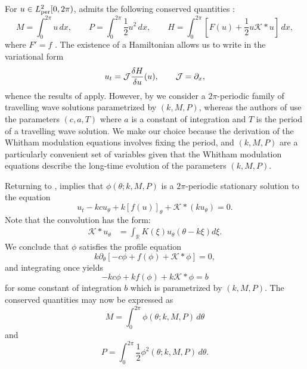 \documentclass[11pt,leqno]{article}
\numberwithin{equation}{section}
\renewcommand\d{\partial}
\newcommand{\R}{\mathbb R}
\theoremstyle{definition}
\begin{document}
For $u\in L^2_{\rm per}[0,2\pi)$,  admits the following conserved quantities \cite{BH14,NS1994}:
\[
M = \int_0^{2\pi} u\, dx, \qquad P = \int_0^{2\pi} \frac{1}{2}u^2\, dx,\qquad H = \int_0^{2\pi} \left[F(u) + \frac{1}{2}u\mathcal{K}*u\right]\,dx,
\]
where $F' = f$ . The existence of a Hamiltonian allows us to write  in the variational form
\[
u_t = \mathcal{J} \fdv{H}{u}()(u), \qquad \mathcal{J}=\d_x,
\]
whence the results of \cite{BH14} apply. However, by  we consider a $ 2\pi $-periodic family of travelling wave solutions parametrized by $ (k,M,P) $, whereas the authors of \cite{BH14} use the parameters $ (c,a,T) $ where $ a $ is a constant of integration and $ T $ is the period of a travelling wave solution. We make our choice because the derivation of the Whitham modulation equations involves fixing the period, and $ (k,M,P) $ are a particularly convenient set of variables given that the Whitham modulation equations describe the long-time evolution of the parameters $(k,M,P)$.

Returning to ,  implies that $\phi(\theta;k,M,P)$ is a $2\pi$-periodic stationary solution to the equation
\begin{equation}\label{eq:stationary}
	u_t - kc u_\theta + k[f(u)]_\theta + \mathcal{K}*(ku_\theta) = 0.
\end{equation} 
Note that the convolution has the form:
\begin{align}
	\mathcal{K}*u_\theta &= \int_{\R}K(\xi)u_{\theta}(\theta-k\xi)d\xi. \label{eq:thetaconv}
\end{align}
We conclude that $\phi$ satisfies the profile equation
\begin{equation}\label{e:profile}
	k\d_\theta\left[-c\phi + f(\phi) + \mathcal{K}*\phi\right]=0,
\end{equation}
and integrating once yields
\begin{equation}\label{e:profile2}
    -kc\phi + kf(\phi) + k\mathcal{K}*\phi = b
\end{equation}
for some constant of integration $b$ which is parametrized by $ (k,M,P) $.  
The conserved quantities may now be expressed as
\begin{equation}\label{e:M}
    M = \int_0^{2\pi} \phi(\theta;k,M,P)\,d\theta
\end{equation}
and
\begin{equation}\label{e:P}
    P = \int_0^{2\pi} \frac{1}{2}\phi^2(\theta;k,M,P)\,d\theta.
\end{equation}
\end{document}
